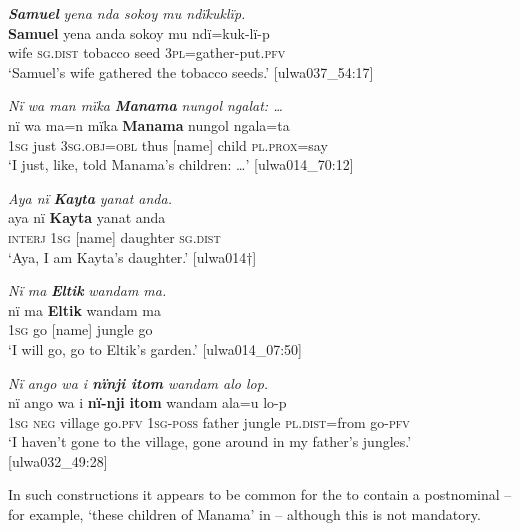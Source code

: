 \ea%
    \label{ex:phrase:30}
          \textbf{\textit{Samuel}} \textit{yena nda sokoy mu ndïkuklïp.}\\
\gll    \textbf{Samuel}  yena  anda    sokoy    mu    ndï=kuk-lï-p\\
    [name]    wife  \textsc{sg.dist}  tobacco  seed  3\textsc{pl}=gather-put.\textsc{pfv}\\
\glt `Samuel’s wife gathered the tobacco seeds.’ [ulwa037\_54:17]
\z

\ea%
    \label{ex:phrase:31}
          \textit{Nï wa man mïka} \textbf{\textit{Manama}} \textit{nungol ngalat: …}\\
\gll    nï    wa  ma=n      mïka  \textbf{Manama}  nungol  ngala=ta\\
    1\textsc{sg}  just  3\textsc{sg.obj}=\textsc{obl}  thus  [name]    child  \textsc{pl.prox}=say\\
\glt `I just, like, told Manama’s children: …’ [ulwa014\_70:12]
\z

\ea%
    \label{ex:phrase:32}
          \textit{Aya nï} \textbf{\textit{Kayta}} \textit{yanat anda.}\\
\gll    aya    nï    \textbf{Kayta}  yanat    anda\\
    \textsc{interj}  1\textsc{sg}  [name]  daughter  \textsc{sg.dist}\\
\glt `Aya, I am Kayta’s daughter.’ [ulwa014†]
\z

\ea%
    \label{ex:phrase:33}
          \textit{Nï ma} \textbf{\textit{Eltik}} \textit{wandam ma.}\\
\gll    nï    ma  \textbf{Eltik}  wandam  ma\\
    1\textsc{sg}  go  [name]  jungle    go\\
\glt `I will go, go to Eltik’s garden.’ [ulwa014\_07:50]
\z

\ea%
    \label{ex:phrase:34}
         \textit{Nï ango wa i \textbf{nïnji itom} wandam alo lop.}\\
\gll    nï    ango  wa    i    \textbf{nï-nji}    \textbf{itom}  wandam     ala=u      lo-p\\
    1\textsc{sg}  \textsc{neg}  village  go.\textsc{pfv}  1\textsc{sg-poss}  father  jungle    \textsc{pl.dist}=from  go-\textsc{pfv}\\
\glt `I haven’t gone to the village, gone around in my father’s jungles.’ [ulwa032\_49:28]
\z

In such constructions it appears to be common for the   to contain a postnominal  -- for example, ‘these children of Manama’ in  -- although this is not mandatory.

